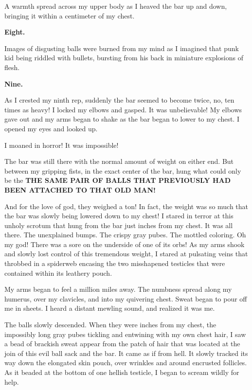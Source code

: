 A warmth spread across my upper body as I heaved the bar up and
down, bringing it within a centimeter of my chest.



{\bf Eight.}



Images of disgusting balls were burned from my mind as I imagined
that punk kid being riddled with bullets, bursting from his back in
miniature explosions of flesh.



{\bf Nine.}



As I crested my ninth rep, suddenly the bar seemed to become twice,
no, ten times as heavy! I locked my elbows and gasped. It was
unbelievable! My elbows gave out and my arms began to shake as the
bar began to lower to my chest. I opened my eyes and looked
up.



I moaned in horror! It was impossible!



The bar was still there with the normal amount of weight on either
end. But between my gripping fists, in the exact center of the bar,
hung what could only be the {\bf THE SAME PAIR OF BALLS THAT
PREVIOUSLY HAD BEEN ATTACHED TO THAT OLD MAN!}



And for the love of god, they weighed a ton! In fact, the weight
was so much that the bar was slowly being lowered down to my chest!
I stared in terror at this unholy scrotum that hung from the bar
just inches from my chest. It was all there. The unexplained bumps.
The crispy gray pubes. The mottled coloring. Oh my god! There was a
sore on the underside of one of its orbs! As my arms shook and
slowly lost control of this tremendous weight, I stared at
pulsating veins that throbbed in a spiderweb encasing the two
misshapened testicles that were contained within its leathery
pouch.



My arms began to feel a million miles away. The numbness spread
along my humerus, over my clavicles, and into my quivering chest.
Sweat began to pour off me in sheets. I heard a distant mewling
sound, and realized it was me.



The balls slowly descended. When they were inches from my chest,
the impossibly long gray pubes tickling and entwining with my own
chest hair, I saw a bead of brackish sweat appear from the patch of
hair that was located at the join of this evil ball sack and the
bar. It came as if from hell. It slowly tracked its way down the
elongated skin pouch, over wrinkles and around encrusted follicles.
As it beaded at the bottom of one hellish testicle, I began to
scream wildly for help.



